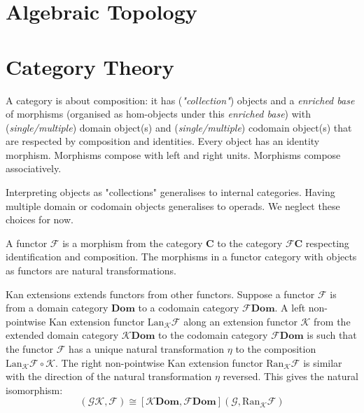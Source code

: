 \documentclass{tufte-book}
\begin{document}
\chapter{Algebraic Topology}
\label{ch:alg-top}

\chapter{Category Theory}
\label{ch:cat-theory}

A category is about composition: it has (\textit{"collection"}) objects and a \textit{enriched base} of morphisms (organised as hom-objects under this \textit{enriched base}) with (\textit{single/multiple}) domain object(s) and (\textit{single/multiple}) codomain object(s) that are respected by composition and identities. Every object has an identity morphism. Morphisms compose with left and right units. Morphisms compose associatively.
 
 Interpreting objects as "collections" generalises to internal categories. Having multiple domain or codomain objects generalises to operads. We neglect these choices for now. 
 
 A functor $\mathcal{F}$ is a morphism from the category $\mathbf{C}$ to the category $\mathcal{F}\mathbf{C}$ respecting identification and composition. The morphisms in a functor category with objects as functors are natural transformations.
 
 Kan extensions extends functors from other functors. Suppose a functor $\mathcal{F}$ is from a domain category $\mathbf{Dom}$ to a codomain category $\mathcal{F} \mathbf{Dom}$. A left non-pointwise Kan extension functor $\mathrm{Lan}_\mathcal{K} \mathcal{F}$ along an extension functor $\mathcal{K}$ from the extended domain category $\mathcal{K} \mathbf{Dom}$ to the codomain category $\mathcal{F} \mathbf{Dom}$ is such that the functor $\mathcal{F}$ has a unique natural transformation $\eta$ to the composition $\mathrm{Lan}_\mathcal{K} \mathcal{F} \circ \mathcal{K}$. The right non-pointwise Kan extension functor $\mathrm{Ran}_\mathcal{K} \mathcal{F}$ is similar with the direction of the natural transformation $\eta$ reversed.
 This gives the natural isomorphism:
 \begin{equation}
     [\mathbf{Dom}, \mathcal{F} \mathbf{Dom}](\mathcal{G} \mathcal{K}, \mathcal{F}) \cong 
     [\mathcal{K} \mathbf{Dom}, \mathcal{F} \mathbf{Dom}](\mathcal{G}, \mathrm{Ran}_\mathcal{K} \mathcal{F})
 \end{equation}
 
\end{document}
